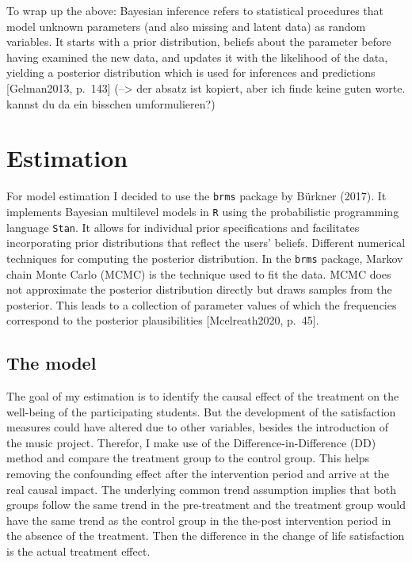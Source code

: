 \documentclass[a4, 12pt]{article}
\begin{document}
To wrap up the above: Bayesian inference refers to statistical procedures that model unknown parameters (and also missing and latent data) as random variables. It starts with a prior distribution, beliefs about the parameter before having examined the new data, and updates it with the likelihood of the data, yielding a posterior distribution which is used for inferences and predictions {[}Gelman2013, p.~143{]} (--\textgreater{} der absatz ist kopiert, aber ich finde keine guten worte. kannst du da ein bisschen umformulieren?)

\hypertarget{estimation}{%
\section{Estimation}\label{estimation}}

\label{ch:estimation}
For model estimation I decided to use the \texttt{brms} package by Bürkner (2017). It implements Bayesian multilevel models in \texttt{R} using the probabilistic programming language \texttt{Stan}. It allows for individual prior specifications and facilitates incorporating prior distributions that reflect the users' beliefs. Different numerical techniques for computing the posterior distribution. In the \texttt{brms} package, Markov chain Monte Carlo (MCMC) is the technique used to fit the data. MCMC does not approximate the posterior distribution directly but draws samples from the posterior. This leads to a collection of parameter values of which the frequencies correspond to the posterior plausibilities {[}Mcelreath2020, p.~45{]}.

\hypertarget{the-model}{%
\subsection{The model}\label{the-model}}

\label{sec:model}
The goal of my estimation is to identify the causal effect of the treatment on the well-being of the participating students. But the development of the satisfaction measures could have altered due to other variables, besides the introduction of the music project. Therefor, I make use of the Difference-in-Difference (DD) method and compare the treatment group to the control group. This helps removing the confounding effect after the intervention period and arrive at the real causal impact.
The underlying common trend assumption implies that both groups follow the same trend in the pre-treatment and the treatment group would have the same trend as the control group in the the-post intervention period in the absence of the treatment. Then the difference in the change of life satisfaction is the actual treatment effect.
\end{document}
